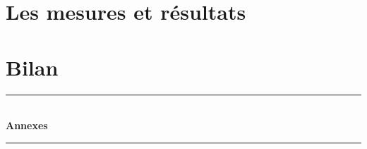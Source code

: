 \documentclass[a4paper,12pt]{report}
\begin{document}
\chapter{Les mesures et résultats}


\chapter*{Bilan}
%





\newpage
\appendix
{}
{}

\vspace*{8cm}
\begin{center}
\rule{\linewidth}{0.5mm}\\[0.7cm]
{\huge{\bfseries Annexes}}\\[0.4cm]
\rule{\linewidth}{0.5mm}\\[0.5cm]


\end{center}
%

\newpage
%
\end{document}
